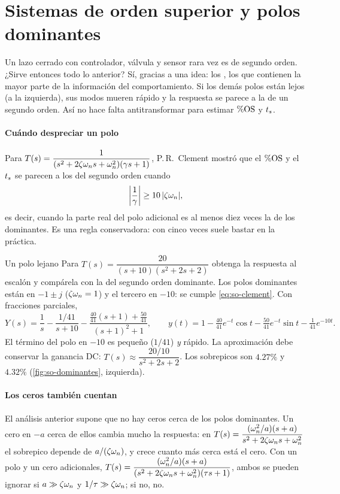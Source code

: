 \section{Sistemas de orden superior y polos dominantes}
\label{sec:so-ordensuperior}

Un lazo cerrado con controlador, válvula y sensor rara vez es de segundo orden. ¿Sirve entonces todo lo anterior? Sí, gracias a una idea: los , los que contienen la mayor parte de la información del comportamiento. Si los demás polos están lejos (a la izquierda), sus modos mueren rápido y la respuesta se parece a la de un segundo orden. Así no hace falta antitransformar para estimar $\%\mathrm{OS}$ y $t_s$.

\paragraph{Cuándo despreciar un polo} Para $T(s)=\dfrac{1}{(s^2+2\zeta\omega_n s+\omega_n^2)(\gamma s+1)}$, P.\,R.\ Clement mostró que el $\%\mathrm{OS}$ y el $t_s$ se parecen a los del segundo orden cuando~\citep{Cle60}
\begin{equation}
  \left|\frac1\gamma\right|\geq10\,|\zeta\omega_n|,
  \label{eq:so-clement}
\end{equation}
es decir, cuando la parte real del polo adicional es al menos diez veces la de los dominantes. Es una regla conservadora: con cinco veces suele bastar en la práctica.

\begin{ejemplo}[label=ej:so-dominantes]{Un polo lejano}
Para $T(s)=\dfrac{20}{(s+10)(s^2+2s+2)}$ obtenga la respuesta al escalón y compárela con la del segundo orden dominante.
\solucion Los polos dominantes están en $-1\pm j$ ($\zeta\omega_n=1$) y el tercero en $-10$: se cumple \eqref{eq:so-clement}. Con fracciones parciales,
\[
  Y(s)=\frac1s-\frac{1/41}{s+10}-\frac{\frac{40}{41}(s+1)+\frac{50}{41}}{(s+1)^2+1},
  \qquad
  y(t)=1-\tfrac{40}{41}e^{-t}\cos t-\tfrac{50}{41}e^{-t}\sin t-\tfrac1{41}e^{-10t}.
\]
El término del polo en $-10$ es pequeño ($1/41$) \emph{y} rápido. La aproximación debe conservar la ganancia DC: $T(s)\approx\dfrac{20/10}{s^2+2s+2}$. Los sobrepicos son $4.27\%$ y $4.32\%$ (\cref{fig:so-dominantes}, izquierda).
\end{ejemplo}

\paragraph{Los ceros también cuentan} El análisis anterior supone que no hay ceros cerca de los polos dominantes. Un cero en $-a$ cerca de ellos cambia mucho la respuesta: en $T(s)=\dfrac{(\omega_n^2/a)(s+a)}{s^2+2\zeta\omega_n s+\omega_n^2}$ el sobrepico depende de $a/(\zeta\omega_n)$, y crece cuanto más cerca está el cero. Con un polo y un cero adicionales, $T(s)=\dfrac{(\omega_n^2/a)(s+a)}{(s^2+2\zeta\omega_n s+\omega_n^2)(\tau s+1)}$, ambos se pueden ignorar si $a\gg\zeta\omega_n$ y $1/\tau\gg\zeta\omega_n$; si no, no.

